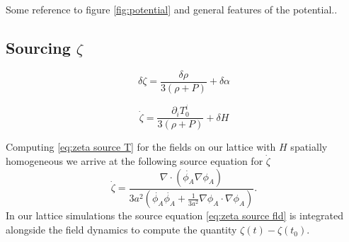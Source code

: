 
Some reference to figure \ref{fig:potential} and general features of the potential..

\subsection{Sourcing $\zeta$}


\begin{equation} \label{eq:zeta differential}
  \delta\zeta = \frac{\delta\rho}{3(\rho + P)} + \delta\alpha
\end{equation} 

\begin{equation} \label{eq:zeta source T}
  \dot{\zeta} = \frac{\partial_iT^i_0}{3(\rho+P)} + \delta H %
\end{equation} 

Computing \eqref{eq:zeta source T} for the fields on our lattice with $H$ spatially homogeneous we arrive at the following source equation for $\dot{\zeta}$
\begin{equation} \label{eq:zeta source fld}
  \dot{\zeta} = \frac{\nabla\cdot(\dot{\phi_A}\nabla\phi_A)}{3a^2(\dot{\phi_A}\dot{\phi_A} +\frac{1}{3a^2}\nabla\phi_A\cdot\nabla\phi_A)}.
\end{equation} 
In our lattice simulations the source equation \eqref{eq:zeta source fld} is integrated alongside the field dynamics to compute the quantity $\zeta(t) - \zeta(t_0)$. 

